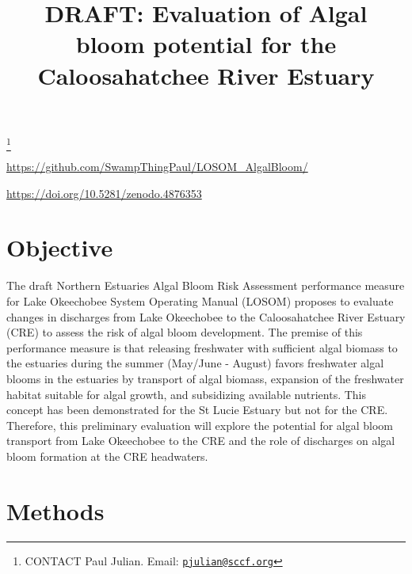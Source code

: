 \documentclass[]{interact}
\theoremstyle{plain}%
\theoremstyle{definition}
\theoremstyle{remark}
\begin{document}

\title{DRAFT: Evaluation of Algal bloom potential for the Caloosahatchee
River Estuary}


\author{
}

\thanks{CONTACT Paul
Julian. Email: \href{mailto:pjulian@sccf.org}{\nolinkurl{pjulian@sccf.org}}}

\maketitle



\begin{github}
\url{https://github.com/SwampThingPaul/LOSOM_AlgalBloom/}
\end{github}

\begin{DOI}
\url{https://doi.org/10.5281/zenodo.4876353}
\end{DOI}

\hypertarget{objective}{%
\section{Objective}\label{objective}}

The draft Northern Estuaries Algal Bloom Risk Assessment performance
measure for Lake Okeechobee System Operating Manual (LOSOM) proposes to
evaluate changes in discharges from Lake Okeechobee to the
Caloosahatchee River Estuary (CRE) to assess the risk of algal bloom
development. The premise of this performance measure is that releasing
freshwater with sufficient algal biomass to the estuaries during the
summer (May/June - August) favors freshwater algal blooms in the
estuaries by transport of algal biomass, expansion of the freshwater
habitat suitable for algal growth, and subsidizing available nutrients.
This concept has been demonstrated for the St Lucie Estuary
\citep{phlips_hurricanes_2020} but not for the CRE. Therefore, this
preliminary evaluation will explore the potential for algal bloom
transport from Lake Okeechobee to the CRE and the role of discharges on
algal bloom formation at the CRE headwaters.

\hypertarget{methods}{%
\section{Methods}\label{methods}}
\end{document}
